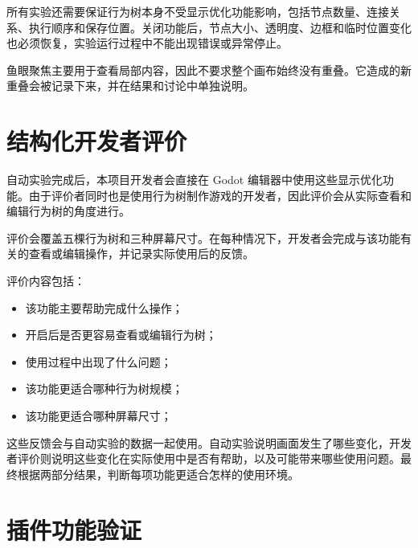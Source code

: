 \documentclass[11pt,a4paper,oneside,extrafontsizes]{memoir}
\begin{document}
所有实验还需要保证行为树本身不受显示优化功能影响，包括节点数量、连接关系、执行顺序和保存位置。关闭功能后，节点大小、透明度、边框和临时位置变化也必须恢复，实验运行过程中不能出现错误或异常停止。

鱼眼聚焦主要用于查看局部内容，因此不要求整个画布始终没有重叠。它造成的新重叠会被记录下来，并在结果和讨论中单独说明。

\section{结构化开发者评价}

自动实验完成后，本项目开发者会直接在 Godot 编辑器中使用这些显示优化功能。由于评价者同时也是使用行为树制作游戏的开发者，因此评价会从实际查看和编辑行为树的角度进行。

评价会覆盖五棵行为树和三种屏幕尺寸。在每种情况下，开发者会完成与该功能有关的查看或编辑操作，并记录实际使用后的反馈。

评价内容包括：

\begin{itemize}[leftmargin=*]
\item 该功能主要帮助完成什么操作；
\end{itemize}

\begin{itemize}[leftmargin=*]
\item 开启后是否更容易查看或编辑行为树；
\end{itemize}

\begin{itemize}[leftmargin=*]
\item 使用过程中出现了什么问题；
\end{itemize}

\begin{itemize}[leftmargin=*]
\item 该功能更适合哪种行为树规模；
\end{itemize}

\begin{itemize}[leftmargin=*]
\item 该功能更适合哪种屏幕尺寸；
\end{itemize}

这些反馈会与自动实验的数据一起使用。自动实验说明画面发生了哪些变化，开发者评价则说明这些变化在实际使用中是否有帮助，以及可能带来哪些使用问题。最终根据两部分结果，判断每项功能更适合怎样的使用环境。

\section{插件功能验证}
\end{document}

